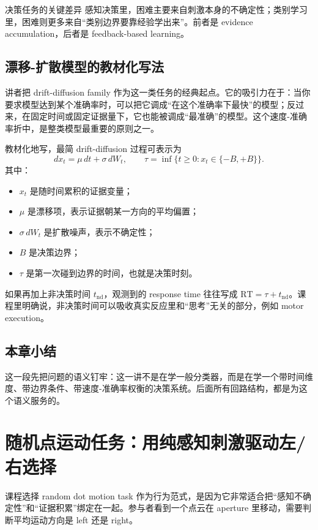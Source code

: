 \documentclass[a4paper]{article}
\begin{document}
\begin{knowledgebox}{决策任务的关键差异}
感知决策里，困难主要来自刺激本身的不确定性；类别学习里，困难则更多来自“类别边界要靠经验学出来”。前者是 evidence accumulation，后者是 feedback-based learning。
\end{knowledgebox}

\subsection{漂移-扩散模型的教材化写法}
讲者把 drift-diffusion family 作为这一类任务的经典起点。它的吸引力在于：当你要求模型达到某个准确率时，可以把它调成“在这个准确率下最快”的模型；反过来，在固定时间或固定证据量下，它也能被调成“最准确”的模型。这个速度-准确率折中，是整类模型最重要的原则之一。

教材化地写，最简 drift-diffusion 过程可表示为
\begin{equation}
dx_t = \mu\,dt + \sigma\,dW_t, \qquad
\tau = \inf\{t \ge 0 : x_t \in \{-B, +B\}\}.
\end{equation}
其中：
\begin{itemize}
    \item $x_t$ 是随时间累积的证据变量；
    \item $\mu$ 是漂移项，表示证据朝某一方向的平均偏置；
    \item $\sigma\,dW_t$ 是扩散噪声，表示不确定性；
    \item $B$ 是决策边界；
    \item $\tau$ 是第一次碰到边界的时间，也就是决策时刻。
\end{itemize}
如果再加上非决策时间 $t_{\mathrm{nd}}$，观测到的 response time 往往写成 $\mathrm{RT}=\tau+t_{\mathrm{nd}}$。课程里明确说，非决策时间可以吸收真实反应里和“思考”无关的部分，例如 motor execution。

\subsection{本章小结}
这一段先把问题的语义钉牢：这一讲不是在学一般分类器，而是在学一个带时间维度、带边界条件、带速度-准确率权衡的决策系统。后面所有回路结构，都是为这个语义服务的。

\section{随机点运动任务：用纯感知刺激驱动左/右选择}
课程选择 random dot motion task 作为行为范式，是因为它非常适合把“感知不确定性”和“证据积累”绑定在一起。参与者看到一个点云在 aperture 里移动，需要判断平均运动方向是 left 还是 right。
\end{document}
